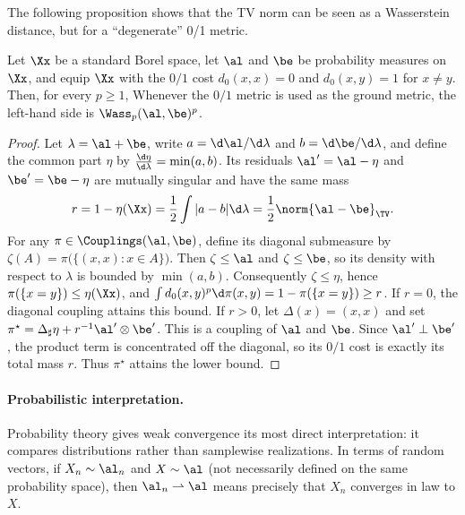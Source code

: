 The following proposition shows that the TV norm can be seen as a Wasserstein distance, but for a ``degenerate'' 0/1 metric.

\begin{prop}\label{prop-rel-wass-tv}
		Let $\Xx$ be a standard Borel space, let $\al$ and $\be$ be probability measures on $\Xx$, and equip $\Xx$ with the $0/1$ cost $d_0(x,x)=0$ and $d_0(x,y)=1$ for $x\neq y$. Then, for every $p\geq1$,
		Whenever the $0/1$ metric is used as the ground metric, the left-hand side is $\Wass_p(\al,\be)^p$.
\end{prop}
\begin{proof}
		Let $\lambda=\al+\be$, write $a=\d\al/\d\lambda$ and $b=\d\be/\d\lambda$, and define the common part $\eta$ by
		\(\frac{\d\eta}{\d\lambda}=\min(a,b)\).
		Its residuals $\al'=\al-\eta$ and $\be'=\be-\eta$ are mutually singular and have the same mass
		\[
			r
			=
			1-\eta(\Xx)
			=
			\frac12\int|a-b|\d\lambda
			=
			\frac12\norm{\al-\be}_{\TV}.
		\]
		For any $\pi\in\Couplings(\al,\be)$, define its diagonal submeasure by
		\(\zeta(A)=\pi\bigl(\{(x,x):x\in A\}\bigr)\).
		Then $\zeta\leq\al$ and $\zeta\leq\be$, so its density with respect to $\lambda$ is bounded by $\min(a,b)$. Consequently $\zeta\leq\eta$, hence $\pi(\{x=y\})\leq\eta(\Xx)$, and
		$\int d_0(x,y)^p\d\pi(x,y)=1-\pi(\{x=y\})\geq r$.
		If $r=0$, the diagonal coupling attains this bound. If $r>0$, let $\Delta(x)=(x,x)$ and set
		$\pi^\star=\Delta_\sharp\eta+r^{-1}\al^{\prime}\otimes\be^{\prime}$.
		This is a coupling of $\al$ and $\be$. Since $\al'\perp\be'$, the product term is concentrated off the diagonal, so its $0/1$ cost is exactly its total mass $r$. Thus $\pi^\star$ attains the lower bound.
\end{proof}


\paragraph{Probabilistic interpretation.}

Probability theory gives weak convergence its most direct interpretation: it compares distributions rather than samplewise realizations. In terms of random vectors, if $X_n \sim \al_n$ and $X \sim \al$ (not necessarily defined on the same probability space), then $\al_n\rightharpoonup\al$ means precisely that $X_n$ converges in law to $X$.

